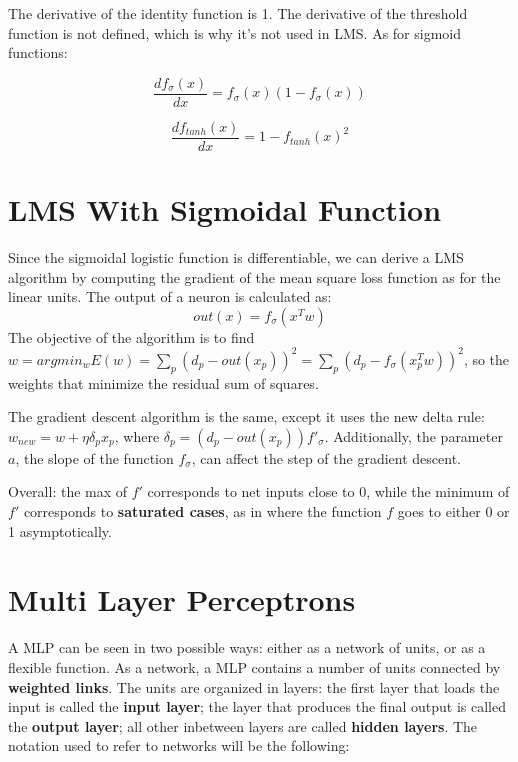 The derivative of the identity function is 1. The derivative of the threshold function is not defined, which is why it's not used in LMS. As for sigmoid functions:

\begin{equation*}
    \dfrac{df_{\sigma}(x)}{dx} = f_{\sigma}(x)(1-f_{\sigma}(x)) 
\end{equation*}

\begin{equation*}
    \dfrac{df_{tanh}(x)}{dx} = 1 - f_{tanh}(x)^2
\end{equation*}

\section{LMS With Sigmoidal Function}

Since the sigmoidal logistic function is differentiable, we can derive a LMS algorithm by computing the gradient of the mean square loss function as for the linear units. The output of a neuron is calculated as:
\begin{equation*}
    out(x) = f_{\sigma}(x^Tw)
\end{equation*}
The objective of the algorithm is to find $w = argmin_w E(w) = \sum_p (d_p - out(x_p))^2 = \sum_p (d_p - f_{\sigma}(x_p^Tw))^2$, so the weights that minimize the residual sum of squares.

The gradient descent algorithm is the same, except it uses the new delta rule: $w_{new} = w + \eta \delta_p x_p$, where $\delta_p = (d_p - out(x_p))f'_{\sigma}$. Additionally, the parameter $a$, the slope of the function $f_{\sigma}$, can affect the step of the gradient descent.

Overall: the max of $f'$ corresponds to net inputs close to 0, while the minimum of $f'$ corresponds to \textbf{saturated cases}, as in where the function $f$ goes to either 0 or 1 asymptotically.

\section{Multi Layer Perceptrons}

A MLP can be seen in two possible ways: either as a network of units, or as a flexible function. As a network, a MLP contains a number of units connected by \textbf{weighted links}. The units are organized in layers: the first layer that loads the input is called the \textbf{input layer}; the layer that produces the final output is called the \textbf{output layer}; all other inbetween layers are called \textbf{hidden layers}. The notation used to refer to networks will be the following:

